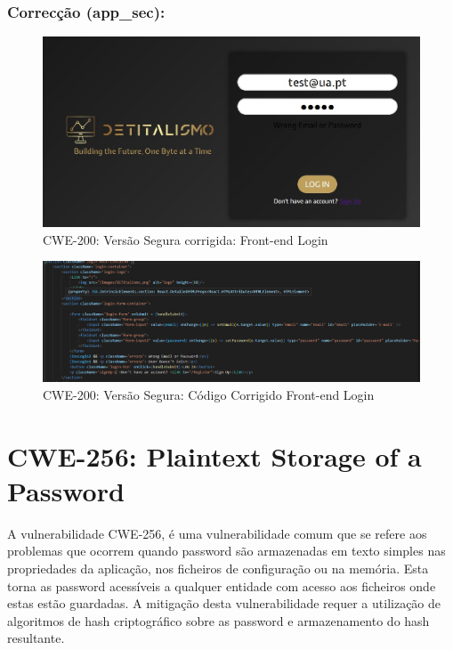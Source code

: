 \subsubsection{Correcção (app\_sec):}

\begin{figure}[H]
  \centering
  \includegraphics[width=16cm]{images/CWE-200-segura.jpg}
  \caption{CWE-200: Versão Segura corrigida: Front-end Login }
  \label{fig:cwe200-segura}
\end{figure}

\begin{figure}[H]
  \centering
  \includegraphics[width=16cm]{images/CWE-200-cod1s.png}
  \caption{CWE-200: Versão Segura: Código Corrigido Front-end Login }
  \label{fig:cwe200-cod1s}
\end{figure}

%
%
\section{CWE-256: Plaintext Storage of a Password}
\label{sec.cwe256}
A vulnerabilidade CWE-256, é uma vulnerabilidade comum que se refere aos problemas que ocorrem quando password são armazenadas em texto simples nas propriedades da aplicação, nos ficheiros de configuração ou na memória. Esta torna as password acessíveis a qualquer entidade com acesso aos ficheiros onde estas estão guardadas. A mitigação desta vulnerabilidade requer a utilização de algoritmos de hash criptográfico sobre as password e armazenamento do hash resultante.
\\
